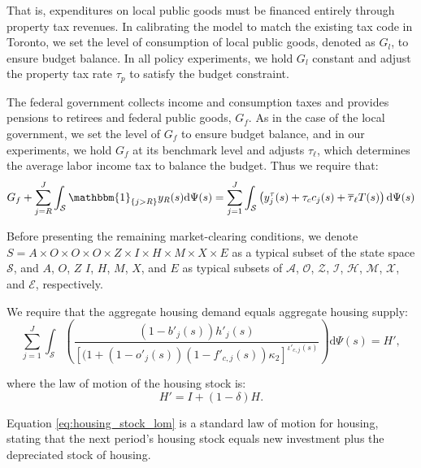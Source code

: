 \documentclass[parskip=full]{article}
\begin{document}
\noindent That is, expenditures on local public goods must be financed entirely through property tax revenues. In calibrating the model to match the existing tax code in Toronto, we set the level of consumption of local public goods, denoted as $G_l$, to ensure budget balance. In all policy experiments, we hold $G_l$ constant and adjust the property tax rate $\tau_{p}$ to satisfy the budget constraint.

The federal government collects income and consumption taxes and provides pensions to retirees and federal public goods, $G_{f}$. As in the case of the local government, we set the level of $G_{f}$ to ensure budget balance, and in our experiments, we hold $G_{f}$ at its benchmark level and adjusts $\tau_\ell$, which determines the average labor income tax to balance the budget. Thus we require that:
\begin{align}\label{eq:gbc_2}
   G_{f}+\sum_{j=R}^J \int_\mathcal{S} \mathbbm{1}_{\{j>R\}} y_{R}(s) \mathrm{d}\Psi(s)=\sum_{j=1}^J \int_\mathcal{S} \left(y^{\tau}_{j}(s)+\tau_{c}c_{j}(s)+\overline{\tau}_{\ell}T(s)\right)\mathrm{d}\Psi(s) 
\end{align}

Before presenting the remaining market-clearing conditions, we denote $S=A\times O \times O \times O \times Z \times I \times H\times M\times X \times E$ as a typical subset of the state space $\mathcal{S}$, and $A$, $O$, $Z$ $I$, $H$, $M$, $X$, and $E$ as typical subsets of $\mathcal{A}$, $\mathcal{O}$, $\mathcal{Z}$, $\mathcal{I}$, $\mathcal{H}$, $\mathcal{M}$, $\mathcal{X}$, and $\mathcal{E}$, respectively.

We require that the aggregate housing demand equals aggregate housing supply:
\begin{equation}
\label{eq:housing_clearing_condition}
  \sum_{j=1}^J \int_\mathcal{S}  \left(\frac{(1-b'_{j}(s))h'_{j}(s)}{\left[(1+(1-o'_{j}(s))(1-f'_{c,j}(s))\kappa_{2}\right]^{\iota'_{c,j}(s)}}\right) \mathrm{d}\Psi(s) = H',
\end{equation}

\noindent where the law of motion of the housing stock is: 
\begin{equation}\label{eq:housing_stock_lom}
H'=I+(1-\delta)H.
\end{equation}

\noindent Equation \eqref{eq:housing_stock_lom} is a standard law of motion for housing, stating that the next period's housing stock equals new investment plus the depreciated stock of housing. 
\end{document}
